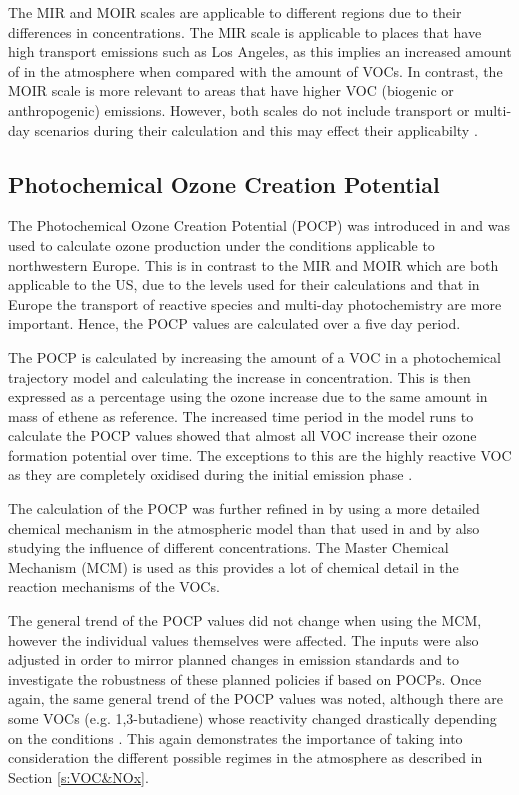 The MIR and MOIR scales are applicable to different regions due to their differences in  concentrations. The MIR scale
is applicable to places that have high transport emissions such as Los Angeles, as this implies an increased amount of 
 in the atmosphere when compared with the amount of VOCs. In contrast, the MOIR scale is more relevant to areas that 
have higher VOC (biogenic or anthropogenic) emissions. However, both scales do not include transport or multi-day scenarios 
during their calculation and this may effect their applicabilty \citep{Capps:2010}.

\subsection{Photochemical Ozone Creation Potential}
The Photochemical Ozone Creation Potential (POCP) was introduced in \citep{Derwent:1996} and was used to calculate ozone 
production under the conditions applicable to northwestern Europe. This is in contrast to the MIR and MOIR which are both 
applicable to the US, due to the  levels used for their calculations and that in Europe the transport of reactive 
species and multi-day photochemistry are more important. Hence, the POCP values are calculated over a five day period.

The POCP is calculated by increasing the amount of a VOC in a photochemical trajectory model and calculating the increase in 
 concentration. This is then expressed as a percentage using the ozone increase due to the same amount in mass of ethene
as reference. The increased time period in the model runs  to calculate the POCP values showed that almost all VOC increase 
their ozone formation potential over time. The exceptions to this are the highly reactive VOC as they are completely oxidised 
during the initial emission phase \citep{Derwent:1996}. 

The calculation of the POCP was further refined in \citep{Derwent:1998} by using a more detailed chemical mechanism in the 
atmospheric model than that used in \citep{Derwent:1996} and by also studying the influence of different  
concentrations. The Master Chemical Mechanism (MCM) is used as this provides a lot of chemical detail in the reaction 
mechanisms of the VOCs. 

The general trend of the POCP values did not change when using the MCM, however the individual values themselves were affected.
The  inputs were also adjusted in order to mirror planned changes in  emission standards and to investigate 
the robustness of these planned policies if based on POCPs. Once again, the same general trend of the POCP values was noted, 
although there are some VOCs (e.g. 1,3-butadiene) whose reactivity changed drastically depending on the  conditions 
\citep{Derwent:1998}. This again demonstrates the importance of taking into consideration the different possible regimes in the 
atmosphere as described in Section \ref{s:VOC&NOx}.

